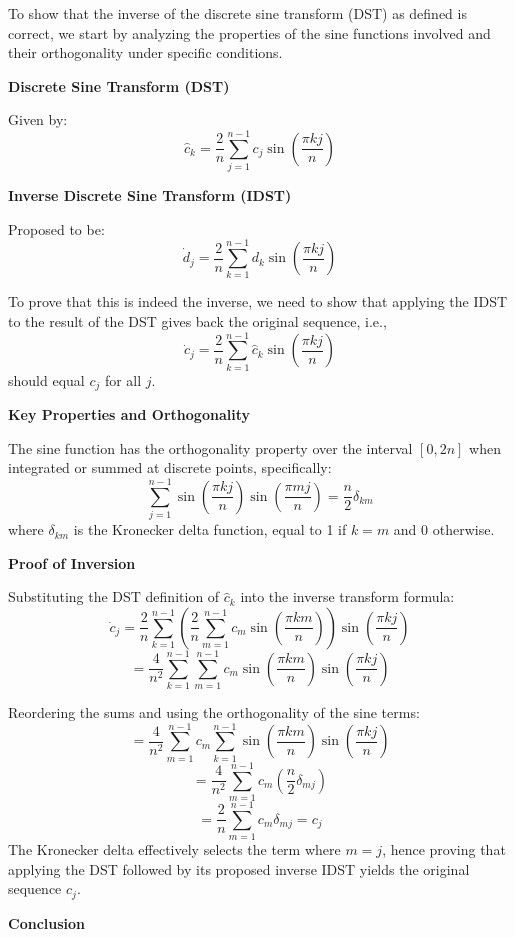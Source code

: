 \documentclass[8pt]{article}
\begin{document}
{To show that the inverse of the discrete sine transform (DST) as defined is correct, we start by analyzing the properties of the sine functions involved and their orthogonality under specific conditions.

\textbf{Discrete Sine Transform (DST)}

Given by:
\[
\hat{c}_k = \frac{2}{n} \sum_{j=1}^{n-1} c_j \sin \left( \frac{\pi kj}{n} \right)
\]

\textbf{Inverse Discrete Sine Transform (IDST)}

Proposed to be:
\[
\dot{d}_j = \frac{2}{n} \sum_{k=1}^{n-1} d_k \sin \left( \frac{\pi kj}{n} \right)
\]

To prove that this is indeed the inverse, we need to show that applying the IDST to the result of the DST gives back the original sequence, i.e.,
\[
\dot{c}_j = \frac{2}{n} \sum_{k=1}^{n-1} \hat{c}_k \sin \left( \frac{\pi kj}{n} \right)
\]
should equal \( c_j \) for all \( j \).

\textbf{Key Properties and Orthogonality}

The sine function has the orthogonality property over the interval \([0, 2n]\) when integrated or summed at discrete points, specifically:
\[
\sum_{j=1}^{n-1} \sin \left( \frac{\pi kj}{n} \right) \sin \left( \frac{\pi mj}{n} \right) = \frac{n}{2} \delta_{km}
\]
where \( \delta_{km} \) is the Kronecker delta function, equal to 1 if \( k = m \) and 0 otherwise.

\textbf{Proof of Inversion}

Substituting the DST definition of \( \hat{c}_k \) into the inverse transform formula:
\[
\dot{c}_j = \frac{2}{n} \sum_{k=1}^{n-1} \left( \frac{2}{n} \sum_{m=1}^{n-1} c_m \sin \left( \frac{\pi km}{n} \right) \right) \sin \left( \frac{\pi kj}{n} \right)
\]
\[
= \frac{4}{n^2} \sum_{k=1}^{n-1} \sum_{m=1}^{n-1} c_m \sin \left( \frac{\pi km}{n} \right) \sin \left( \frac{\pi kj}{n} \right)
\]

Reordering the sums and using the orthogonality of the sine terms:
\[
= \frac{4}{n^2} \sum_{m=1}^{n-1} c_m \sum_{k=1}^{n-1} \sin \left( \frac{\pi km}{n} \right) \sin \left( \frac{\pi kj}{n} \right)
\]
\[
= \frac{4}{n^2} \sum_{m=1}^{n-1} c_m \left( \frac{n}{2} \delta_{mj} \right)
\]
\[
= \frac{2}{n} \sum_{m=1}^{n-1} c_m \delta_{mj} = c_j
\]
The Kronecker delta effectively selects the term where \( m = j \), hence proving that applying the DST followed by its proposed inverse IDST yields the original sequence \( c_j \).

\textbf{Conclusion}

}
\end{document}
